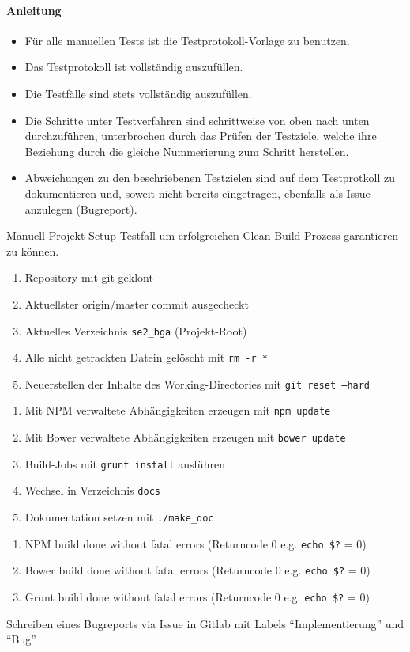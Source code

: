 \paragraph{Anleitung}
\begin{itemize}
\item Für alle manuellen Tests ist die Testprotokoll-Vorlage zu benutzen.
\item Das Testprotokoll ist vollständig auszufüllen.
\item Die Testfälle sind stets vollständig auszufüllen.
\item Die Schritte unter Testverfahren sind schrittweise von oben nach unten durchzuführen, unterbrochen durch das Prüfen der Testziele, welche ihre Beziehung durch die gleiche Nummerierung zum Schritt herstellen.
\item Abweichungen zu den beschriebenen Testzielen sind auf dem Testprotkoll zu dokumentieren und, soweit nicht bereits eingetragen, ebenfalls als Issue anzulegen (Bugreport).
\end{itemize}
\newpage
\begin{testcase}[tc:build]{Manuell}
\tcSubject Projekt-Setup
\tcRemark Testfall um erfolgreichen Clean-Build-Prozess garantieren zu können.
\tcConditions
	\begin{enumerate}
	\item Repository mit git geklont
	\item Aktuellster origin/master commit ausgecheckt
	\item Aktuelles Verzeichnis \texttt{se2\_bga} (Projekt-Root)
	\item Alle nicht getrackten Datein gelöscht mit \texttt{rm -r *}
	\item Neuerstellen der Inhalte des Working-Directories mit \texttt{git reset --hard}
	\end{enumerate}
\tcProceeding
	\begin{enumerate}
	\item Mit NPM verwaltete Abhängigkeiten erzeugen mit \texttt{npm update}
	\item Mit Bower verwaltete Abhängigkeiten erzeugen mit \texttt{bower update}
	\item Build-Jobs mit \texttt{grunt install} ausführen
	\item Wechsel in Verzeichnis \texttt{docs}
	\item Dokumentation setzen mit \texttt{./make\_doc}
	\end{enumerate}
\tcGoal
	\begin{enumerate}
	\item NPM build done without fatal errors (Returncode 0 e.g. \texttt{echo \$?} = 0)
	\item Bower build done without fatal errors (Returncode 0 e.g. \texttt{echo \$?} = 0)
	\item Grunt build done without fatal errors (Returncode 0 e.g. \texttt{echo \$?} = 0)
	\end{enumerate}
\tcError Schreiben eines Bugreports via Issue in Gitlab mit Labels "`Implementierung"' und "`Bug"'
\end{testcase}

